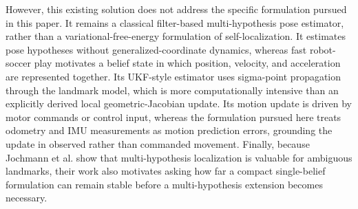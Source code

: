 However, this existing solution does not address the specific formulation pursued in this paper. It remains a classical filter-based multi-hypothesis pose estimator, rather than a variational-free-energy formulation of self-localization. It estimates pose hypotheses without generalized-coordinate dynamics, whereas fast robot-soccer play motivates a belief state in which position, velocity, and acceleration are represented together. Its UKF-style estimator uses sigma-point propagation through the landmark model, which is more computationally intensive than an explicitly derived local geometric-Jacobian update. Its motion update is driven by motor commands or control input, whereas the formulation pursued here treats odometry and IMU measurements as motion prediction errors, grounding the update in observed rather than commanded movement. Finally, because Jochmann et al. show that multi-hypothesis localization is valuable for ambiguous landmarks, their work also motivates asking how far a compact single-belief formulation can remain stable before a multi-hypothesis extension becomes necessary.


